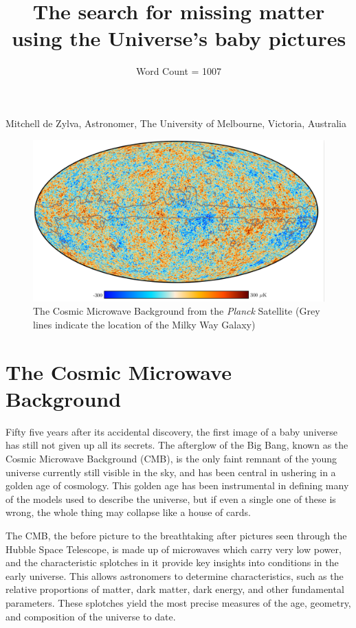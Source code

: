 \documentclass{article}
\title{The search for missing matter using the Universe's baby pictures}
\author{Word Count = 1007}
\begin{document}
\maketitle

Mitchell de Zylva, Astronomer, The University of Melbourne, Victoria, Australia



\begin{figure}[H]
    \label{fig:planck}
    \begin{center}
        \includegraphics[scale=0.3]{planck_cmb.png}
        \caption{The Cosmic Microwave Background from the \textit{Planck} Satellite (Grey lines indicate the location of the Milky Way Galaxy)}
    \end{center}
\end{figure}

\section{The Cosmic Microwave Background}

Fifty five years after its accidental discovery, the first image of a baby universe has still not given up all its secrets. The afterglow of the Big Bang, known as the Cosmic Microwave Background (CMB), is the only faint remnant of the young universe currently still visible in the sky, and has been central in ushering in a golden age of cosmology. This golden age has been instrumental in defining many of the models used to describe the universe, but if even a single one of these is wrong, the whole thing may collapse like a house of cards. 

The CMB, the before picture to the breathtaking after pictures seen through the Hubble Space Telescope, is made up of microwaves which carry very low power, and the characteristic splotches in it provide key insights into conditions in the early universe. This allows astronomers to determine characteristics, such as the relative proportions of matter, dark matter, dark energy, and other fundamental parameters. These splotches yield the most precise measures of the age, geometry, and composition of the universe to date. 
\end{document}
